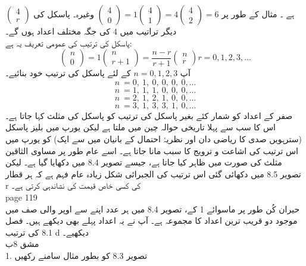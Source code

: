  \(\begin{pmatrix} 4 \\ r \end{pmatrix}\)
 ہے
 ۔  مثال کے طور پر
   \(\begin{pmatrix} 4 \\ 0 \end{pmatrix}=1 \begin{pmatrix} 4 \\ 1 \end{pmatrix} =4 \begin{pmatrix} 4 \\ 2\end{pmatrix}=6\)
 وغیرہ۔ پاسکل کی دیگر تراتیب میں 4 کی جگہ مختلف اعداد ہوں گے۔\\

 پاسکل کی ترتیب کی عمومی تعریف یہ ہے:\\
 \[\begin{pmatrix} n \\ 0 \end{pmatrix}=1 \begin{pmatrix} n \\ r +1 \end{pmatrix} = \frac{n-r}{r+1}\begin{pmatrix} n \\ r \end{pmatrix}  r=0 ,1 ,2,3, ... \]
 آپ
 \(n=0,1,2,3\)
 کے لئے پاسکل کی ترتیب خود بنائیے۔\\
 \[ n\ = 0,\: 1,\: 0,\: 0,\: 0,\: 0, ...  \]
\[ n\ = 1,\: 1,\: 1,\: 0,\: 0,\: 0,  ... \]
\[ n\ = 2,\: 1,\: 2,\: 1,\: 0,\: 0, ...  \]
\[ n\ = 3,\: 1,\: 3,\: 3,\: 1,\: 0,  ... \]
 صفر کے اعداد کو شمار کئے بغیر پاسکل کی ترتیب کو پاسکل کی مثلث کہا جاتا ہے۔ اس کا سب سے پہلا تاریخی حوالہ چین میں ملتا ہے لیکن یورپ میں بلیز پاسکل (سترہویں صدی کا ریاضی دان اور نظریۂ احتمال کے بانیان میں سے ایک) کو یورپ میں اس ترتیب کی اشاعت و ترویج کا سبب مانا جاتا ہے۔ اسے عام طور پر مساوی الثاقین مثلث کی صورت میں ظاہر کیا جاتا ہے، جیسے تصویر 8.4 میں دکھایا گیا ہے۔ لیکن تصویر 8.5 میں دکھائی گئی اس ترتیب کی الجبرائی شکل زیادہ عام فہم ہے کہ ہر قطار r کی کسی خاص قیمت کی نشاندہی کرتی ہے۔\\
 \clearpage
 page 119\\
 حیران کُن طور پر ماسوائے 1 کے، تصویر 8.4 میں ہر عدد اپنے سے اوپر والی صف میں موجود دو قریب ترین اعداد کا مجموعہ ہے۔
آپ نے یہ اعداد پہلے بھی دیکھے ہیں۔ فصل 8.1 کی ترتیب d دیکھیے۔\\
مشق 8ب\\
1.
تصویر 8.3 کو بطور مثال سامنے رکھیں\\
